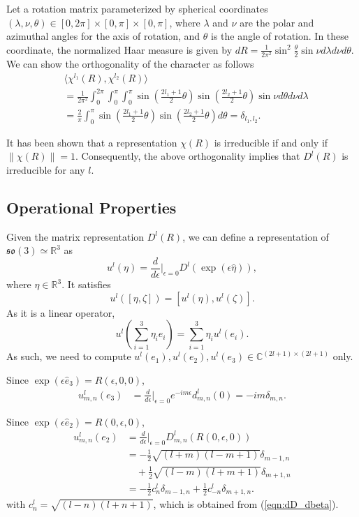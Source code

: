\documentclass[onecolumn,11pt]{ieeetran}
\newcommand{\pair}[1]{\ensuremath{\langle #1 \rangle}}
\newcommand{\refeqn}[1]{(\ref{eqn:#1})}
\newcommand{\so}{\ensuremath{\mathfrak{so}(3)}}
\renewcommand{\Re}{\ensuremath{\mathbb{R}}}
\newcommand{\Cp}{\ensuremath{\mathbb{C}}}
\begin{document}
Let a rotation matrix parameterized by spherical coordinates $(\lambda,\nu,\theta)\in[0,2\pi]\times[0,\pi]\times[0,\pi]$, where $\lambda$ and $\nu$ are the polar and azimuthal angles for the axis of rotation, and $\theta$ is the angle of rotation. In these coordinate, the normalized Haar measure is given by $dR=\frac{1}{2\pi^2} \sin^2\frac{\theta}{2} \sin\nu d\lambda d\nu d\theta$. We can show the orthogonality of the character as follows
\begin{align*}
&\pair{\chi^{l_1}(R), \chi^{l_2}(R)}
\\
&=\frac{1}{2\pi^2} \int_{0}^{2\pi} \int_{0}^\pi \int_0^\pi \sin(\frac{2l_1+1}{2}\theta)\sin(\frac{2l_2+1}{2}\theta) \sin\nu   d\theta  d\nu d\lambda\\
&=\frac{2}{\pi} \int_0^\pi \sin(\frac{2l_1+1}{2}\theta)\sin(\frac{2l_2+1}{2}\theta)  d\theta =\delta_{l_1,l_2}.
\end{align*}

It has been shown that a representation $\chi(R)$ is irreducible if and only if $\|\chi(R)\|=1$. Consequently, the above orthogonality implies that $D^l(R)$ is irreducible for any $l$.


\subsection{Operational Properties}

Given the matrix representation $D^l(R)$, we can define a representation of $\so\simeq \Re^3$ as
\[
u^l(\eta)= \frac{d}{d\epsilon}\bigg|_{\epsilon=0} D^l(\exp(\epsilon\hat\eta)),
\]
where $\eta\in\Re^3$. It satisfies
\[
u^l([\eta,\zeta])=[u^l(\eta),u^l(\zeta)].
\]
As it is a linear operator,
\[
u^l(\sum_{i=1}^3 \eta_i e_i) = \sum_{i=1}^3 \eta_i u^l(e_i).
\]
As such, we need to compute $u^l(e_1),u^l(e_2),u^l(e_3)\in\Cp^{(2l+1)\times(2l+1)}$ only.

Since $\exp(\epsilon\hat e_3) = R(\epsilon,0,0)$,
\begin{align}
u^l_{m,n}(e_3) & = \frac{d}{d\epsilon}\bigg|_{\epsilon=0} e^{-im\epsilon}d^l_{m,n}(0)=-im\delta_{m,n}.
\end{align}

Since $\exp(\epsilon\hat e_2) = R(0,\epsilon,0)$, 
\begin{align}
u^l_{m,n}(e_2) & = \frac{d}{d\epsilon}\bigg|_{\epsilon=0} D^l_{m,n}(R(0,\epsilon,0))\nonumber\\
& = -\frac{1}{2}\sqrt{(l+m)(l-m+1)} \delta_{m-1,n}\nonumber\\
& \quad + \frac{1}{2}\sqrt{(l-m)(l+m+1)} \delta_{m+1,n}\nonumber\\
& = -\frac{1}{2}c^l_n \delta_{m-1,n}+\frac{1}{2}c^l_{-n} \delta_{m+1,n}.
\end{align}
with $c^l_n=\sqrt{(l-n)(l+n+1)}$, which is obtained from \refeqn{dD_dbeta}.
\end{document}

